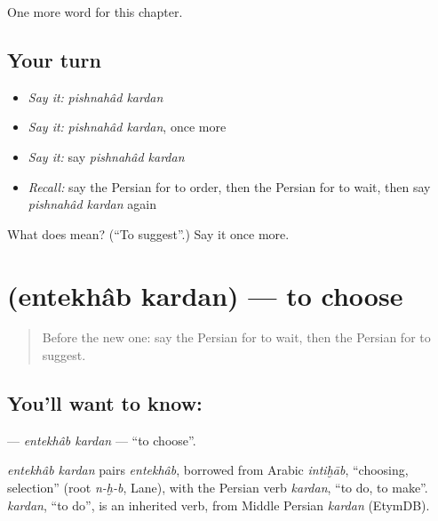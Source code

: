 \begin{grammarlens}[title={What you've built}]
One more word for this chapter.
\end{grammarlens}

\subsection*{Your turn}
\begin{itemize}
\raggedright
  \item \emph{Say it:} \emph{pishnahâd kardan}
  \item \emph{Say it:} \emph{pishnahâd kardan}, once more
  \item \emph{Say it:} say \emph{pishnahâd kardan}
  \item \emph{Recall:} say the Persian for to order, then the Persian for to wait, then say \emph{pishnahâd kardan} again
\end{itemize}

\begin{tcolorbox}[breakable,colback=teal!4,colframe=teal!35!black,title={Before you move on}]
What does   mean? (\textquotedblleft{}To suggest\textquotedblright{}.) Say it once more.
\end{tcolorbox}
\section[\texorpdfstring{\fa{انتخاب} \fa{کردن} (entekhâb kardan)}{انتخاب کردن (entekhâb kardan)}]{  (entekhâb kardan) — to choose}

\label{lesson:FA-C142-entekhab-kardan}



\begin{quote}
Before the new one: say the Persian for to wait, then the Persian for to suggest.
\end{quote}

\subsection*{You'll want to know:  }
\textbf{ } — \emph{entekhâb kardan} — \textquotedblleft{}to choose\textquotedblright{}.

\begin{cousinweb}
\emph{entekhâb kardan} pairs \emph{entekhâb}, borrowed from Arabic \emph{intiḫāb}, \textquotedblleft{}choosing, selection\textquotedblright{} (root \emph{n-ḫ-b}, Lane), with the Persian verb \emph{kardan}, \textquotedblleft{}to do, to make\textquotedblright{}. \emph{kardan}, \textquotedblleft{}to do\textquotedblright{}, is an inherited verb, from Middle Persian \emph{kardan} (EtymDB).
\end{cousinweb}

